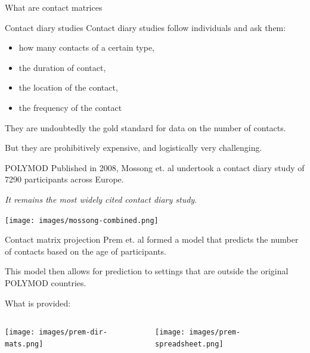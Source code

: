 \documentclass[
  14pt,
  ignorenonframetext,
  aspectratio=169,
]{beamer}
\author{M. J. Lydeamore}
\date{22 September 2024}
\providecommand{\tightlist}{%
  \setlength{\itemsep}{0pt}\setlength{\parskip}{0pt}}\usepackage{longtable,booktabs,array}
\begin{document}
\frame{\titlepage}

\begin{frame}{What are contact matrices}
\label{what-are-contact-matrices}
\end{frame}

\begin{frame}{Contact diary studies}
\label{contact-diary-studies}
Contact diary studies follow individuals and ask them:

\begin{itemize}
\tightlist
\item
  how many contacts of a certain type,
\item
  the duration of contact,
\item
  the location of the contact,
\item
  the frequency of the contact
\end{itemize}

They are undoubtedly the gold standard for data on the number of
contacts.

But they are prohibitively expensive, and logistically very challenging.
\end{frame}

\begin{frame}{POLYMOD}
\label{polymod}
Published in 2008, Mossong et. al undertook a contact diary study of
7290 participants across Europe.

\emph{It remains the most widely cited contact diary study}.

\begin{center}
\texttt{[image: images/mossong-combined.png]}
\end{center}
\end{frame}

\begin{frame}{Contact matrix projection}
\label{contact-matrix-projection}
Prem et. al formed a model that predicts the number of contacts based on
the age of participants.

This model then allows for prediction to settings that are outside the
original POLYMOD countries.
\end{frame}

\begin{frame}{What is provided:}
\label{what-is-provided}
\begin{columns}[T]
\begin{column}{0.5\textwidth}
\begin{center}
\texttt{[image: images/prem-dir-mats.png]}
\end{center}
\end{column}

\begin{column}{0.5\textwidth}
\begin{center}
\texttt{[image: images/prem-spreadsheet.png]}
\end{center}
\end{column}
\end{columns}
\end{frame}
\end{document}
